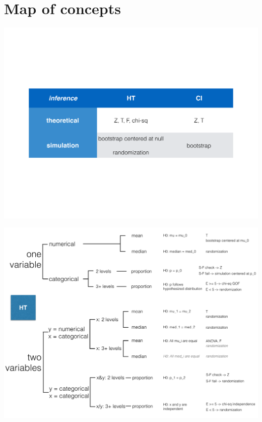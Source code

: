 \documentclass[11pt,containsverbatim,handout,xcolor=xelatex,dvipsnames,table]{beamer}
\begin{document}

\section{Map of concepts}


\begin{frame}

\vfill

\begin{center}
\includegraphics[width=\textwidth]{figures/mt2_review_map1}
\end{center}

\vfill

\end{frame}


\begin{frame}

\begin{center}
\includegraphics[width=\textwidth]{figures/mt2_review_map2}
\end{center}

\end{frame}
\end{document}
